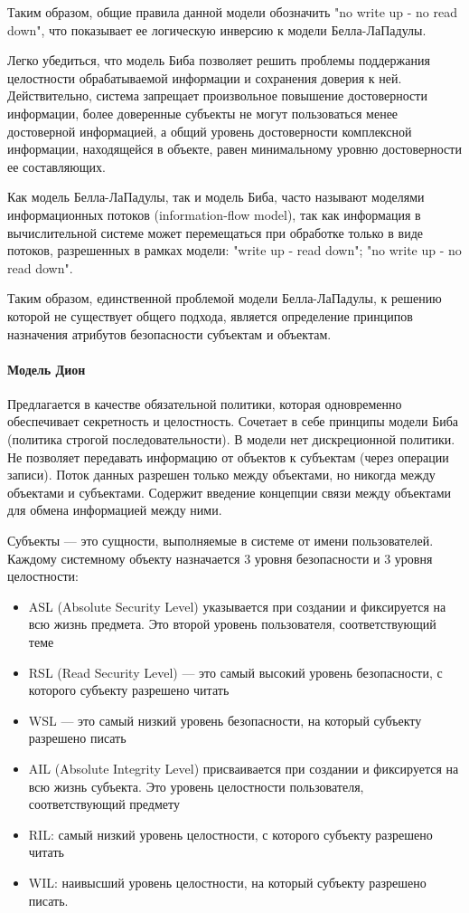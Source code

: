 Таким образом, общие правила данной модели обозначить "no write up - no read down", что показывает ее логическую инверсию к модели Белла-ЛаПадулы.

Легко убедиться, что модель Биба позволяет решить проблемы поддержания целостности обрабатываемой информации и сохранения доверия к ней. Действительно, система запрещает произвольное повышение достоверности информации, более доверенные субъекты не могут пользоваться менее достоверной информацией, а общий уровень достоверности комплексной информации, находящейся в объекте, равен минимальному уровню достоверности ее составляющих.

Как модель Белла-ЛаПадулы, так и модель Биба, часто называют моделями информационных потоков (information-flow model), так как информация в вычислительной системе может перемещаться при обработке только в виде потоков, разрешенных в рамках модели: "write up - read down"; "no write up - no read down".

Таким образом, единственной проблемой модели Белла-ЛаПадулы, к решению которой не существует общего подхода, является определение принципов назначения атрибутов безопасности субъектам и объектам.

\paragraph{Модель Дион}

Предлагается в качестве обязательной политики, которая одновременно обеспечивает секретность и целостность.
Сочетает в себе принципы модели Биба (политика строгой последовательности). В модели нет дискреционной
политики. Не позволяет передавать информацию от объектов к субъектам (через операции записи). Поток данных
разрешен только между объектами, но никогда между объектами и субъектами. Содержит введение концепции связи между
объектами для обмена информацией между ними.

Субъекты --- это сущности, выполняемые в системе от имени пользователей. Каждому системному объекту назначается
3 уровня безопасности и 3 уровня целостности:
\begin{itemize}
    \item ASL (Absolute Security Level) указывается при создании и фиксируется на всю жизнь предмета. Это второй уровень
    пользователя, соответствующий теме
    \item RSL (Read Security Level) --- это самый высокий уровень безопасности, с которого субъекту разрешено читать
    \item WSL --- это самый низкий уровень безопасности, на который субъекту разрешено писать
    \item AIL (Absolute Integrity Level) присваивается при создании и фиксируется на всю жизнь субъекта. Это уровень
    целостности пользователя, соответствующий предмету
    \item RIL: самый низкий уровень целостности, с которого субъекту разрешено читать
    \item WIL: наивысший уровень целостности, на который субъекту разрешено писать.
\end{itemize}

